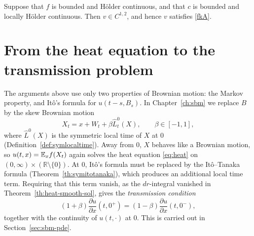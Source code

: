 \begin{theorem}\label{th:fk-smooth}
	Suppose that $f$ is bounded and Hölder continuous, and that $c$ is bounded
	and locally Hölder continuous. Then $v\in C^{1,2}$, and hence $v$ satisfies
	\ref{fkA}.
\end{theorem}

\section{From the heat equation to the transmission problem}\label{sec:pde-to-sbm}

The arguments above use only two properties of Brownian motion: the Markov
property, and Itô's formula for $u(t-s,B_s)$. In Chapter~\ref{ch:sbm} we
replace $B$ by the skew Brownian motion
\[
	X_t = x + W_t + \beta\hat{L}^0_t(X), \qquad \beta\in[-1,1],
\]
where $\hat{L}^0(X)$ is the symmetric local time of $X$ at $0$
(Definition~\ref{def:symlocaltime}). Away from $0$, $X$ behaves like a Brownian
motion, so $u(t,x) = \mathbb{E}_x f(X_t)$ again solves the heat equation \eqref{eq:heat}
on $(0,\infty)\times(\mathbb{R}\setminus\{0\})$. At $0$, Itô's formula must be
replaced by the Itô--Tanaka formula (Theorem~\ref{th:symitotanaka}), which
produces an additional local time term. Requiring that this term vanish, as
the $dr$-integral vanished in Theorem~\ref{th:heat-smooth-sol}, gives the
\emph{transmission condition}
\[
	(1+\beta)\frac{\partial u}{\partial x}(t,0^+) = (1-\beta)\frac{\partial u}{\partial x}(t,0^-),
\]
together with the continuity of $u(t,\cdot)$ at $0$. This is carried out in
Section~\ref{sec:sbm-pde}.
